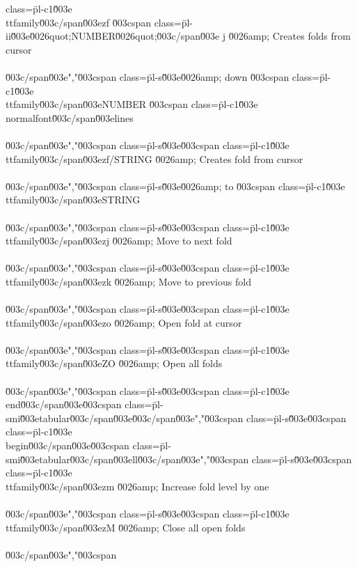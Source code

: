 class=\"pl-c1\"\u003e\\ttfamily\u003c/span\u003e{zf \u003cspan class=\"pl-ii\"\u003e\u0026quot;NUMBER\u0026quot;\u003c/span\u003e j} \u0026amp; Creates folds from cursor\\\\\u003c/span\u003e","\u003cspan class=\"pl-s\"\u003e\u0026amp; down \u003cspan class=\"pl-c1\"\u003e\\ttfamily\u003c/span\u003e{NUMBER} \u003cspan class=\"pl-c1\"\u003e\\normalfont\u003c/span\u003e{lines}\\\\\u003c/span\u003e","\u003cspan class=\"pl-s\"\u003e\u003cspan class=\"pl-c1\"\u003e\\ttfamily\u003c/span\u003e{zf/STRING} \u0026amp; Creates fold from cursor\\\\\u003c/span\u003e","\u003cspan class=\"pl-s\"\u003e\u0026amp; to \u003cspan class=\"pl-c1\"\u003e\\ttfamily\u003c/span\u003e{STRING}\\\\\u003c/span\u003e","\u003cspan class=\"pl-s\"\u003e\u003cspan class=\"pl-c1\"\u003e\\ttfamily\u003c/span\u003e{zj} \u0026amp; Move to next fold\\\\\u003c/span\u003e","\u003cspan class=\"pl-s\"\u003e\u003cspan class=\"pl-c1\"\u003e\\ttfamily\u003c/span\u003e{zk} \u0026amp; Move to previous fold\\\\\u003c/span\u003e","\u003cspan class=\"pl-s\"\u003e\u003cspan class=\"pl-c1\"\u003e\\ttfamily\u003c/span\u003e{zo} \u0026amp; Open fold at cursor\\\\\u003c/span\u003e","\u003cspan class=\"pl-s\"\u003e\u003cspan class=\"pl-c1\"\u003e\\ttfamily\u003c/span\u003e{ZO} \u0026amp; Open all folds\\\\\u003c/span\u003e","\u003cspan class=\"pl-s\"\u003e\u003cspan class=\"pl-c1\"\u003e\\end\u003c/span\u003e{\u003cspan class=\"pl-smi\"\u003etabular\u003c/span\u003e}\u003c/span\u003e","\u003cspan class=\"pl-s\"\u003e\u003cspan class=\"pl-c1\"\u003e\\begin\u003c/span\u003e{\u003cspan class=\"pl-smi\"\u003etabular\u003c/span\u003e}{ll}\u003c/span\u003e","\u003cspan class=\"pl-s\"\u003e\u003cspan class=\"pl-c1\"\u003e\\ttfamily\u003c/span\u003e{zm} \u0026amp; Increase fold level by one\\\\\u003c/span\u003e","\u003cspan class=\"pl-s\"\u003e\u003cspan class=\"pl-c1\"\u003e\\ttfamily\u003c/span\u003e{zM} \u0026amp; Close all open folds\\\\\u003c/span\u003e","\u003cspan 